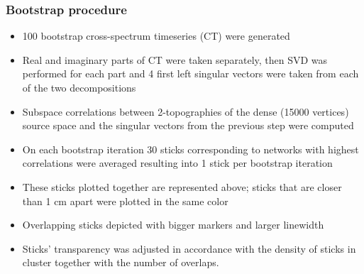 \documentclass{article}
\begin{document}
\subsubsection{Bootstrap procedure}
\begin{itemize}
    \item 100 bootstrap cross-spectrum timeseries (CT) were generated
    \item Real and imaginary parts of CT were taken separately, then
          SVD was performed for each part and 4 first left singular vectors were taken
          from each of the two decompositions
    \item Subspace correlations between 2-topographies of the dense (15000 vertices)
          source space and the singular vectors from the previous step were computed
    \item On each bootstrap iteration 30 sticks corresponding to networks 
          with highest correlations were averaged resulting into 1 stick per bootstrap iteration
    \item These sticks plotted together are represented above;
          sticks that are closer than 1 cm apart were plotted in the same color
    \item Overlapping sticks depicted with bigger markers and larger linewidth
    \item Sticks' transparency was adjusted in accordance with the density of sticks in
          cluster together with the number of overlaps.
\end{itemize}
\end{document}
